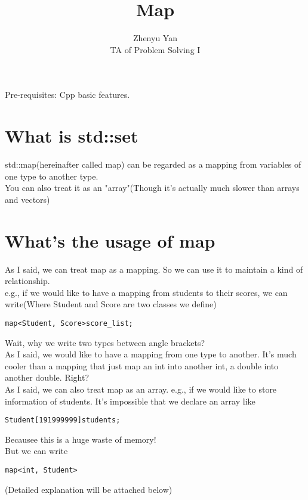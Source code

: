 \documentclass{article}
\title{Map}
\author{Zhenyu Yan\\TA of Problem Solving I}
\date{}
\begin{document}
\maketitle
Pre-requisites: Cpp basic features.
\section{What is std::set}
std::map(hereinafter called map) can be regarded as a mapping from variables of one type to another type.\\
You can also treat it as an "array"(Though it's actually much slower than arrays and vectors)
\section{What's the usage of map}
As I said, we can treat map as a mapping. So we can use it to maintain a kind of relationship.\\
e.g., if we would like to have a mapping from students to their scores, we can write(Where Student and Score are two classes we define)\\
\begin{lstlisting}
map<Student, Score>score_list;
\end{lstlisting}
Wait, why we write two types between angle brackets?\\
As I said, we would like to have a mapping from one type to another. It's much cooler than a mapping that just map an int into another int, a double into another double. Right?\\
As I said, we can also treat map as an array.
 e.g., if we would like to store information of students. It's impossible that we declare an array like
\begin{lstlisting}
Student[191999999]students;
\end{lstlisting}
Becausee this is a huge waste of memory!\\
But we can write
\begin{lstlisting}
map<int, Student>
\end{lstlisting}
(Detailed explanation will be attached below)
\newpage
\end{document}
